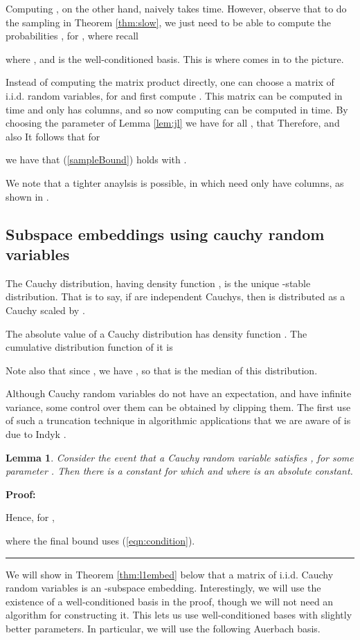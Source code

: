\documentclass[11pt]{article}
\newtheorem{lemma}[theorem]{Lemma}
\newenvironment{proof}{\begin{trivlist} \item {\bf Proof:~~}}
  {\qed\end{trivlist}}
\def\qed{\hfill\rule{2mm}{2mm}}
\begin{document}
Computing , on the other hand, naively takes  time. 
However, observe that to do the sampling
in Theorem \ref{thm:slow}, we just need to be able to compute the probabilities , for , where recall

where , and  
is the well-conditioned basis. This is where  comes in to the picture.

Instead of computing the matrix product  directly, one can choose a  matrix
 of i.i.d.  random variables, for  
and first compute . This matrix can be 
computed in  time and only has  columns, and so now 
computing  
can be computed in  time. By choosing
the parameter  of Lemma \ref{lem:jl} we have
for all , that  Therefore,
 and
also 
It follows that for 

we have that (\ref{sampleBound}) holds with . 

We note that a tighter anaylsis is possible, in which  need only have  columns, as shown 
in \cite{CDMMMW13}. 

\subsection{Subspace embeddings using cauchy random variables}\label{sec:cauchy}
The Cauchy distribution, having density function 
, 
is the unique -stable distribution.
That is to say, if  are independent Cauchys, then 
 is distributed as a Cauchy scaled by
.

The absolute value of a Cauchy distribution has density function .
The cumulative distribution function  of it is

Note also that since , we have , so that  is the median of this distribution. 

Although Cauchy random variables do not have an expectation, and have infinite variance, some control over them can be
obtained by clipping them. The first use of such a truncation 
technique in algorithmic applications that we are aware of
is due to Indyk \cite{i06}. 

\begin{lemma}\label{lem:truncated}
Consider the event  that a Cauchy random variable  satisfies
, for some parameter . Then there is a constant  for which 
 and 
where  is an absolute constant.  
\end{lemma}
\begin{proof}

Hence, for , 

where the final bound uses (\ref{eqn:condition}). 
\end{proof}
We will show in Theorem \ref{thm:l1embed} below 
that a matrix of i.i.d. Cauchy random variables is an -subspace embedding. Interestingly, we will use the existence of a
well-conditioned basis in the proof, though we will not need an algorithm for constructing it. This lets us use well-conditioned bases with
slightly better parameters. In particular, we will use the following Auerbach basis.
\end{document}

